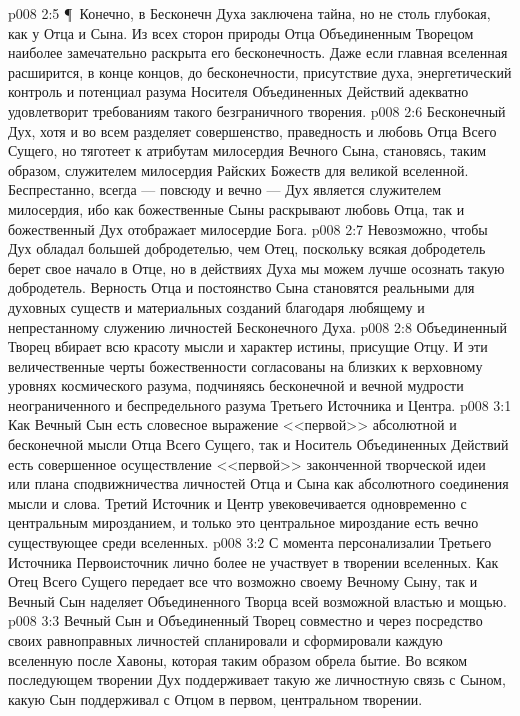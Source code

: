 \vs p008 2:5 \P\ Конечно, в Бесконечн Духа заключена тайна, но не столь глубокая, как у Отца и Сына. Из всех сторон природы Отца Объединенным Творецом наиболее замечательно раскрыта его бесконечность. Даже если главная вселенная расширится, в конце концов, до бесконечности, присутствие духа, энергетический контроль и потенциал разума Носителя Объединенных Действий адекватно удовлетворит требованиям такого безграничного творения.
\vs p008 2:6 Бесконечный Дух, хотя и во всем разделяет совершенство, праведность и любовь Отца Всего Сущего, но тяготеет к атрибутам милосердия Вечного Сына, становясь, таким образом, служителем милосердия Райских Божеств для великой вселенной. Беспрестанно, всегда --- повсюду и вечно --- Дух является служителем милосердия, ибо как божественные Сыны раскрывают любовь Отца, так и божественный Дух отображает милосердие Бога.
\vs p008 2:7 Невозможно, чтобы Дух обладал большей добродетелью, чем Отец, поскольку всякая добродетель берет свое начало в Отце, но в действиях Духа мы можем лучше осознать такую добродетель. Верность Отца и постоянство Сына становятся реальными для духовных существ и материальных созданий благодаря любящему и непрестанному служению личностей Бесконечного Духа.
\vs p008 2:8 Объединенный Творец вбирает всю красоту мысли и характер истины, присущие Отцу. И эти величественные черты божественности согласованы на близких к верховному уровнях космического разума, подчиняясь бесконечной и вечной мудрости неограниченного и беспредельного разума Третьего Источника и Центра.
\vs p008 3:1 Как Вечный Сын есть словесное выражение <<первой>> абсолютной и бесконечной мысли Отца Всего Сущего, так и Носитель Объединенных Действий есть совершенное осуществление <<первой>> законченной творческой идеи или плана сподвижничества личностей Отца и Сына как абсолютного соединения мысли и слова. Третий Источник и Центр увековечивается одновременно с центральным мирозданием, и только это центральное мироздание есть вечно существующее среди вселенных.
\vs p008 3:2 С момента персонализалии Третьего Источника Первоисточник лично более не участвует в творении вселенных. Как Отец Всего Сущего передает все что возможно своему Вечному Сыну, так и Вечный Сын наделяет Объединенного Творца всей возможной властью и мощью.
\vs p008 3:3 Вечный Сын и Объединенный Творец совместно и через посредство своих равноправных личностей спланировали и сформировали каждую вселенную после Хавоны, которая таким образом обрела бытие. Во всяком последующем творении Дух поддерживает такую же личностную связь с Сыном, какую Сын поддерживал с Отцом в первом, центральном творении.
